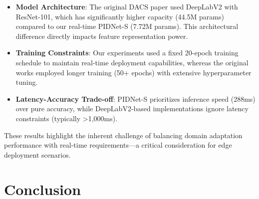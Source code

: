 \documentclass{article}
\begin{document}
\begin{multicols}{2}
		\begin{itemize}
			\item \textbf{Model Architecture}: The original DACS paper used DeepLabV2 with ResNet-101, which has significantly higher capacity (44.5M params) compared to our real-time PIDNet-S (7.72M params). This architectural difference directly impacts feature representation power.
			\item \textbf{Training Constraints}: Our experiments used a fixed 20-epoch training schedule to maintain real-time deployment capabilities, whereas the original works employed longer training (50+ epochs) with extensive hyperparameter tuning.
			\item \textbf{Latency-Accuracy Trade-off}: PIDNet-S prioritizes inference speed (288ms) over pure accuracy, while DeepLabV2-based implementations ignore latency constraints (typically >1,000ms).
		\end{itemize}
		
		\justifying
		These results highlight the inherent challenge of balancing domain adaptation performance with real-time requirements—a critical consideration for edge deployment scenarios.
		
		\begin{center}
			\label{tab:uda_comparison}
		\end{center} 

		\section{Conclusion}
		\justifying



\end{multicols}
\end{document}
